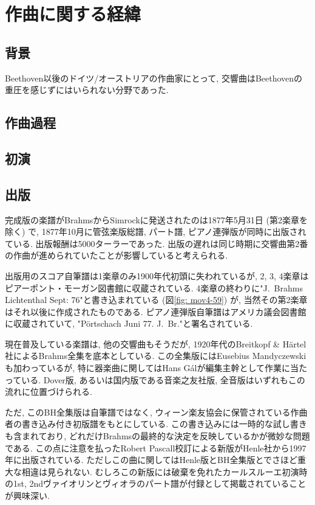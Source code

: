 
\chapter{作曲に関する経緯}

\section{背景}

Beethoven以後のドイツ/オーストリアの作曲家にとって, 交響曲はBeethovenの重圧を感じずにはいられない分野であった.




\section{作曲過程}

\section{初演}

\section{出版}

完成版の楽譜がBrahmsからSimrockに発送されたのは1877年5月31日 (第2楽章を除く) で\cite{library},
1877年10月に管弦楽版総譜, パート譜, ピアノ連弾版が同時に出版されている\cite{frisch}. 出版報酬は5000ターラーであった\cite{henle}.
出版の遅れは同じ時期に交響曲第2番の作曲が進められていたことが影響していると考えられる.

出版用のスコア自筆譜は1楽章のみ1900年代初頭に失われているが, 2, 3, 4楽章はピアーポント・モーガン図書館に収蔵されている.
4楽章の終わりに"J.~Brahms Lichtenthal Sept: 76"と書き込まれている (図\ref{fig: mov4-59}) が, 当然その第2楽章はそれ以後に作成されたものである.
ピアノ連弾版自筆譜はアメリカ議会図書館に収蔵されていて, "Pörtschach Juni 77. J.~Br."と署名されている\cite{frisch}.

現在普及している楽譜は, 他の交響曲もそうだが, 1920年代のBreitkopf \& Härtel社によるBrahms全集を底本としている.
この全集版にはEusebius Mandyczewskiも加わっているが, 特に器楽曲に関してはHans Gálが編集主幹として作業に当たっている.
Dover版, あるいは国内版である音楽之友社版\cite{ogt}, 全音版はいずれもこの流れに位置づけられる.

ただ, このBH全集版は自筆譜ではなく, ウィーン楽友協会に保管されている作曲者の書き込み付き初版譜をもとにしている.
この書き込みには一時的な試し書きも含まれており, どれだけBrahmsの最終的な決定を反映しているかが微妙な問題である.
この点に注意を払ったRobert Pascall校訂による新版がHenle社から1997年に出版されている\cite{henle}.
ただしこの曲に関してはHenle版とBH全集版とでさほど重大な相違は見られない.
むしろこの新版には破棄を免れたカールスルーエ初演時の1st, 2ndヴァイオリンとヴィオラのパート譜が付録として掲載されていることが興味深い.

